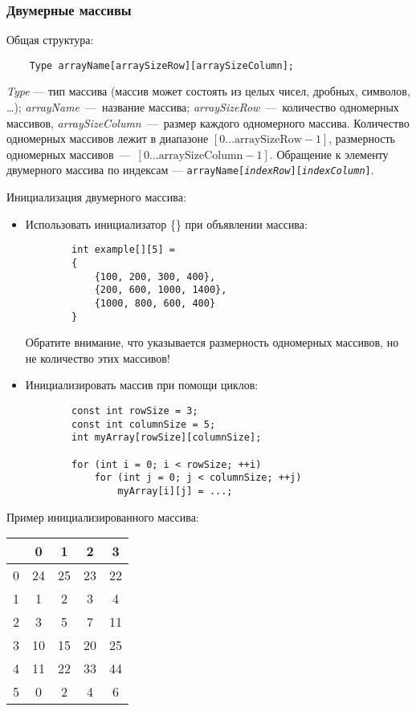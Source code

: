 \subsubsection{Двумерные массивы}
Общая структура:
\begin{lstlisting}
    Type arrayName[arraySizeRow][arraySizeColumn];
\end{lstlisting}

\textit{Type} --- тип массива (массив может состоять из целых чисел, дробных, символов, \ldots); \textit{arrayName}~---~название массива; \textit{arraySizeRow}~---~количество одномерных массивов, \textit{arraySizeColumn}~---~размер каждого одномерного массива. Количество одномерных массивов лежит в диапазоне $\left[ 0 \ldots \text{arraySizeRow} - 1 \right]$, размерность одномерных массивов~---~$\left[ 0 \ldots \text{arraySizeColumn} - 1 \right]$. Обращение к элементу двумерного массива по индексам --- \texttt{arrayName[\textit{indexRow}][\textit{indexColumn}]}.

Инициализация двумерного массива:
\begin{itemize}
    \item Использовать инициализатор \{\} при объявлении массива:
    \begin{lstlisting}
        int example[][5] =
        {
            {100, 200, 300, 400},
            {200, 600, 1000, 1400},
            {1000, 800, 600, 400}
        }
    \end{lstlisting}

    Обратите внимание, что указывается размерность одномерных массивов, но не количество этих массивов!

    \item Инициализировать массив при помощи циклов:
    \begin{lstlisting}
        const int rowSize = 3;
        const int columnSize = 5;
        int myArray[rowSize][columnSize];

        for (int i = 0; i < rowSize; ++i)
            for (int j = 0; j < columnSize; ++j)
                myArray[i][j] = ...;
    \end{lstlisting}
\end{itemize}

Пример инициализированного массива:
\begin{table}[h]
    \begin{tabular}{|c|c|c|c|c|}
        \hline
          & 0 & 1 & 2 & 3 \\
        \hline
        0 & 24 & 25 & 23 & 22 \\
        \hline
        1 & 1 & 2 & 3 & 4 \\
        \hline
        2 & 3 & 5 & 7 & 11 \\
        \hline
        3 & 10 & 15 & 20 & 25 \\
        \hline
        4 & 11 & 22 & 33 & 44 \\
        \hline
        5 & 0 & 2 & 4 & 6 \\
        \hline
    \end{tabular}
\end{table}

